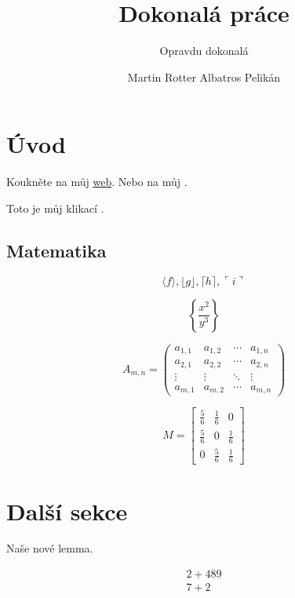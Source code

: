 \documentclass[12pt]{article}
\title{Dokonalá práce}				%
\subtitle{Opravdu dokonalá}
\author{Martin Rotter Albatros Pelikán}
\begin{document}
\maketitle

\section{Úvod}
Koukněte na můj \href{http://www.seznam.cz}{web}. Nebo na můj .

Toto je můj klikací .

\subsection{Matematika}
$$\langle f \rangle, \lfloor g \rfloor,
\lceil h \rceil, \ulcorner i \urcorner$$

$$\left\{\frac{x^2}{y^3}\right\}$$

$$
A_{m,n} =
 \begin{pmatrix}
  a_{1,1} & a_{1,2} & \cdots & a_{1,n} \\
  a_{2,1} & a_{2,2} & \cdots & a_{2,n} \\
  \vdots  & \vdots  & \ddots & \vdots  \\
  a_{m,1} & a_{m,2} & \cdots & a_{m,n}
 \end{pmatrix}
$$

$$
M = \begin{bmatrix}
       \frac{5}{6} & \frac{1}{6} & 0           \\[0.3em]
       \frac{5}{6} & 0           & \frac{1}{6} \\[0.3em]
       0           & \frac{5}{6} & \frac{1}{6}
     \end{bmatrix}
$$

\section{Další sekce}

\begin{lemma}
Naše nové lemma.
\end{lemma}

\begin{align}
2+489 \\
7+2
\end{align}
\end{document}
